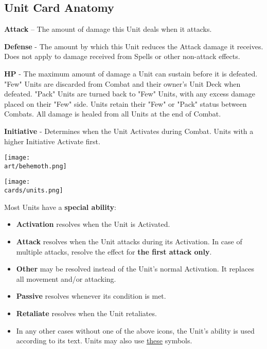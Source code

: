 \begin{multicols}{2}
\subsection*{Unit Card Anatomy}

\vspace{0pt}

\textbf{Attack} – The amount of damage this Unit deals when it attacks.\par
\textbf{Defense} - The amount by which this Unit reduces the Attack damage it receives.
Does not apply to damage received from Spells or other non-attack effects.\par
\textbf{\hypertarget{HP}{HP}} - The maximum amount of damage a Unit can sustain before it is defeated.
"Few" Units are discarded from Combat and their owner's Unit Deck when defeated.
"Pack" Units are turned back to "Few" Units, with any excess damage placed on their "Few" side.
Units retain their "Few" or "Pack" status between Combats.
All damage is healed from all Units at the end of Combat.\par
{\hypertarget{Initiative}{\textbf{Initiative}}} - Determines when the Unit Activates during Combat.
Units with a higher Initiative Activate first.

\vfill
\hspace{-2em}
\texttt{[image: \\art/behemoth.png]}

\begin{center}
  \texttt{[image: \\cards/units.png]}
\end{center}

\bigbreak

Most Units have a \textbf{special ability}:\par
\begin{itemize}[wide]
  \item\textbf{Activation}  resolves when the Unit is Activated.
  \item\textbf{Attack}  resolves when the Unit attacks during its Activation.
    In case of multiple attacks, resolve the effect for \textbf{the first attack only}.
  \item\textbf{Other}  may be resolved instead of the Unit's normal Activation.
    It replaces all movement and/or attacking.
  \item\textbf{Passive}  resolves whenever its condition is met.
  \item\textbf{Retaliate}  resolves when the Unit retaliates.
  \item In any other cases without one of the above icons, the Unit's ability is used according to its text.
    Units may also use \hyperlink{Playerdecks}{these} symbols.
\end{itemize}


\end{multicols}
